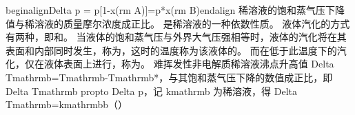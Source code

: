{}\markdownRendererDollarSign{}\markdownRendererBackslash{}begin\markdownRendererLeftBrace{}align\markdownRendererRightBrace{}\markdownRendererBackslash{}Delta p \markdownRendererAmpersand{}= p\markdownRendererCircumflex{}[1-x(\markdownRendererLeftBrace{}\markdownRendererBackslash{}rm A\markdownRendererRightBrace{})]\markdownRendererBackslash{}\markdownRendererAmpersand{}=p\markdownRendererCircumflex{}*x(\markdownRendererLeftBrace{}\markdownRendererBackslash{}rm B\markdownRendererRightBrace{})\markdownRendererBackslash{}end\markdownRendererLeftBrace{}align\markdownRendererRightBrace{}\markdownRendererDollarSign{}\markdownRendererParagraphSeparator
{}稀溶液的饱和蒸气压下降值与稀溶液的质量摩尔浓度成正比。\markdownRendererInterblockSeparator
{}
\markdownRendererSectionEnd 
\markdownRendererSectionEnd \markdownRendererSectionBegin
{}\markdownRendererInterblockSeparator
{}是稀溶液的一种依数性质。\markdownRendererInterblockSeparator
{}\markdownRendererSectionBegin
{}\markdownRendererInterblockSeparator
{}液体汽化的方式有两种，即和。 当液体的饱和蒸气压与外界大气压强相等时，液体的汽化将在其表面和内部同时发生，称为，这时的温度称为该液体的。 而在低于此温度下的汽化，仅在液体表面上进行，称为。\markdownRendererParagraphSeparator
{}难挥发性非电解质稀溶液沸点升高值 \markdownRendererDollarSign{}\markdownRendererBackslash{}Delta T\markdownRendererUnderscore{}\markdownRendererBackslash{}mathrm\markdownRendererLeftBrace{}b\markdownRendererRightBrace{}=T\markdownRendererUnderscore{}\markdownRendererBackslash{}mathrm\markdownRendererLeftBrace{}b\markdownRendererRightBrace{}-T\markdownRendererUnderscore{}\markdownRendererBackslash{}mathrm\markdownRendererLeftBrace{}b\markdownRendererRightBrace{}\markdownRendererCircumflex{}*\markdownRendererDollarSign{}，与其饱和蒸气压下降的数值成正比，即 \markdownRendererDollarSign{}\markdownRendererBackslash{}Delta T\markdownRendererUnderscore{}\markdownRendererBackslash{}mathrm\markdownRendererLeftBrace{}b\markdownRendererRightBrace{} \markdownRendererBackslash{}propto \markdownRendererBackslash{}Delta p\markdownRendererDollarSign{}，记 \markdownRendererDollarSign{}k\markdownRendererUnderscore{}\markdownRendererBackslash{}mathrm\markdownRendererLeftBrace{}b\markdownRendererRightBrace{}\markdownRendererDollarSign{} 为稀溶液，得 \markdownRendererDollarSign{}\markdownRendererBackslash{}Delta T\markdownRendererUnderscore{}\markdownRendererBackslash{}mathrm\markdownRendererLeftBrace{}b\markdownRendererRightBrace{}=k\markdownRendererUnderscore{}\markdownRendererBackslash{}mathrm\markdownRendererLeftBrace{}b\markdownRendererRightBrace{}b\markdownRendererDollarSign{}（）\markdownRendererInterblockSeparator
